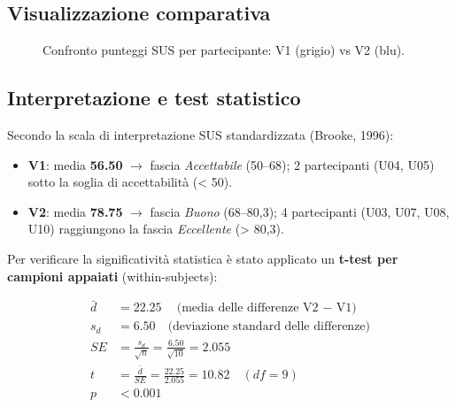 \subsection{Visualizzazione comparativa}

\ifshowimages
\begin{figure}[H]
\centering
{}
\caption{Confronto punteggi SUS per partecipante: V1 (grigio) vs V2 (blu).}
\label{fig:sus_chart}
\end{figure}
\fi

\subsection{Interpretazione e test statistico}

Secondo la scala di interpretazione SUS standardizzata (Brooke, 1996):
\begin{itemize}
    \item \textbf{V1}: media \textbf{56.50} $\to$ fascia \textit{Accettabile} (50--68); 2 partecipanti (U04, U05) sotto la soglia di accettabilità (< 50).
    \item \textbf{V2}: media \textbf{78.75} $\to$ fascia \textit{Buono} (68--80,3); 4 partecipanti (U03, U07, U08, U10) raggiungono la fascia \textit{Eccellente} (> 80,3).
\end{itemize}

Per verificare la significatività statistica è stato applicato un \textbf{t-test per campioni appaiati} (within-subjects):

\begin{align*}
\bar{d}   &= 22.25 \quad \text{(media delle differenze V2 $-$ V1)} \\
s_d       &= 6.50  \quad \text{(deviazione standard delle differenze)} \\
SE        &= \frac{s_d}{\sqrt{n}} = \frac{6.50}{\sqrt{10}} = 2.055 \\
t         &= \frac{\bar{d}}{SE} = \frac{22.25}{2.055} = 10.82 \quad (df = 9) \\
p         &< 0.001
\end{align*}

